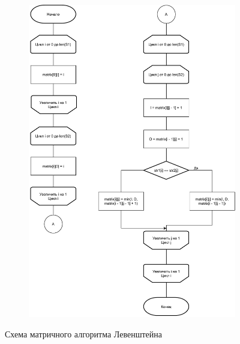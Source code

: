 \documentclass[12pt,a4paper,oneside]{report}
\begin{document}
\begin{figure}[!htpb]
	\centering
	
	\begin{subfigure}[t]{.4\linewidth}
		\includegraphics[height=2\linewidth]{matrix_leven}
	\end{subfigure}
	\quad
	
	\caption{Схема матричного алгоритма Левенштейна}
\end{figure}
\end{document}
